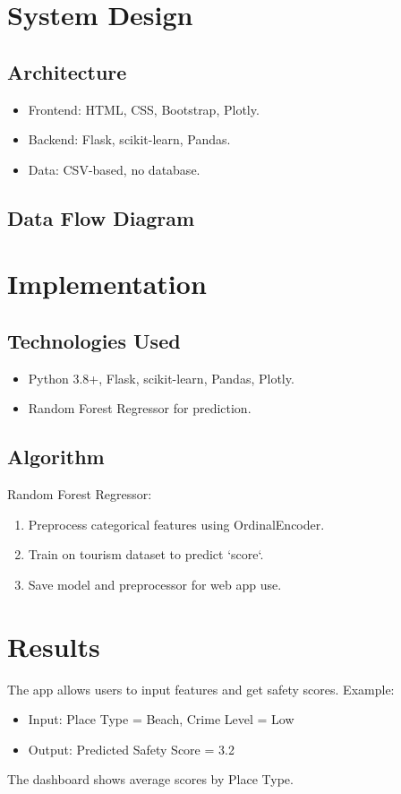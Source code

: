 \documentclass[a4paper,12pt]{article}
\begin{document}
\section{System Design}
\subsection{Architecture}
\begin{itemize}
    \item Frontend: HTML, CSS, Bootstrap, Plotly.
    \item Backend: Flask, scikit-learn, Pandas.
    \item Data: CSV-based, no database.
\end{itemize}

\subsection{Data Flow Diagram}

\section{Implementation}
\subsection{Technologies Used}
\begin{itemize}
    \item Python 3.8+, Flask, scikit-learn, Pandas, Plotly.
    \item Random Forest Regressor for prediction.
\end{itemize}

\subsection{Algorithm}
Random Forest Regressor:
\begin{enumerate}
    \item Preprocess categorical features using OrdinalEncoder.
    \item Train on tourism dataset to predict `score`.
    \item Save model and preprocessor for web app use.
\end{enumerate}

\section{Results}
The app allows users to input features and get safety scores. Example:
\begin{itemize}
    \item Input: Place Type = Beach, Crime Level = Low
    \item Output: Predicted Safety Score = 3.2
\end{itemize}
The dashboard shows average scores by Place Type.
\end{document}
